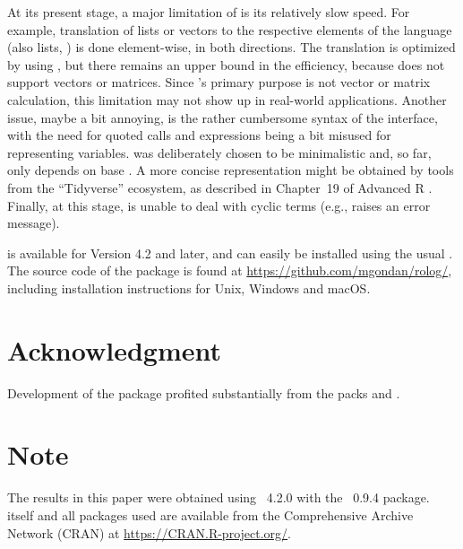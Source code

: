 \documentclass[article]{jss}
\begin{document}
At its present stage, a major limitation of  is its relatively slow
speed. For example, translation of  lists or vectors to the
respective elements of the  language (also lists, )
is done element-wise, in both directions. The translation is optimized by
using  \citep{Edelbuettel2018}, but there remains an upper bound in
the efficiency, because  does not support vectors or
matrices. Since 's primary purpose is not vector or matrix
calculation, this limitation may not show up in real-world applications.
Another issue, maybe a bit annoying, is the rather cumbersome syntax of the
interface, with the need for quoted calls and  expressions being a
bit misused for representing  variables.  was
deliberately chosen to be minimalistic and, so far, only depends on 
base . A more concise representation might be obtained by tools from
the ``Tidyverse'' ecosystem, as described in Chapter\ 19 of 
Advanced R \citep{Wickham2019}. Finally, at this stage,  is unable to
deal with cyclic 
terms (e.g., 
raises an error message).

 is available for  Version 4.2 and later, and can easily
be installed using the usual . The source code
of the package is found at \url{https://github.com/mgondan/rolog/}, including
installation instructions for Unix, Windows and macOS.

\section*{Acknowledgment}

Development of the package profited substantially from 
the  packs  \citep{Rserve} 
and  \citep{Angelopoulos2013}.

\section*{Note}

The results in this paper were obtained 
using ~4.2.0 with 
the ~0.9.4 package.  itself
and all packages used are available from the 
Comprehensive  Archive Network (CRAN) 
at \url{https://CRAN.R-project.org/}.


\end{document}
